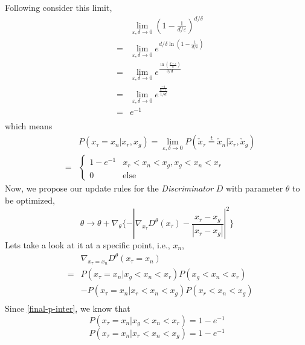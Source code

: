 \documentclass[letterpaper]{article} %
\begin{document}
Following consider this limit,
\begin{eqnarray}\label{limit-constant}
    && \lim_{\varepsilon,\delta\rightarrow0} (1-\frac{1}{d/\varepsilon})^{d/\delta} \nonumber\\
    \nonumber &=& \lim_{\varepsilon,\delta\rightarrow0} e^{d/\delta \ln(1-\frac{1}{d/\varepsilon})} \\
    \nonumber &=& \lim_{\varepsilon,\delta\rightarrow0} e^{\frac{\ln(\frac{d-\varepsilon}{d})}{\delta/d}} \\
    \nonumber &=& \lim_{\varepsilon,\delta\rightarrow0} e^{\frac{\frac{-1}{d-\varepsilon}}{1/d}} \\
    \nonumber &=& e^{-1} \\
\end{eqnarray}
which means
\begin{eqnarray}\label{final-p-inter}
    && P(x_\tau=x_n|x_r,x_g) = \lim_{\varepsilon,\delta\rightarrow0} P(\check{x}_\tau\overset{t}{=}\check{x}_n|\check{x}_r,\check{x}_g) \nonumber\\
    &=&
    \begin{cases}
        1 - e^{-1} &\mbox{$x_r<x_n<x_g,x_g<x_n<x_r$}\\
        0 &\mbox{else}
    \end{cases}
\end{eqnarray}
Now, we propose our update rules for the \textit{Discriminator} $D$ with parameter $\theta$ to be optimized,
\begin{equation}\label{g-loss}
  \theta \longrightarrow \theta + \nabla_{\theta} \{ - |\nabla_{x_{\tau}}D^{\theta}(x_{\tau})-\frac{x_{r}-x_{g}}{|x_{r}-x_{g}|}|^2 \}
\end{equation}
Lets take a look at it at a specific point, i.e., $x_n$,
\begin{eqnarray}\label{p-epsilon-pr-pg-T}
    && \nabla_{x_{\tau}=x_n} D^{\theta}(x_{\tau}=x_n) \nonumber\\
    &=& P(x_\tau=x_n|x_g<x_n<x_r) P(x_g<x_n<x_r) \nonumber\\
    && - P(x_\tau=x_n|x_r<x_n<x_g) P(x_r<x_n<x_g) \nonumber\\
\end{eqnarray}
Since \eqref{final-p-inter}, we know that
\begin{equation}\label{p-inter-conditional-1}
  P(x_\tau=x_n|x_g<x_n<x_r)=1 - e^{-1}
\end{equation}
\begin{equation}\label{p-inter-conditional-2}
  P(x_\tau=x_n|x_r<x_n<x_g)=1 - e^{-1}
\end{equation}
\end{document}
